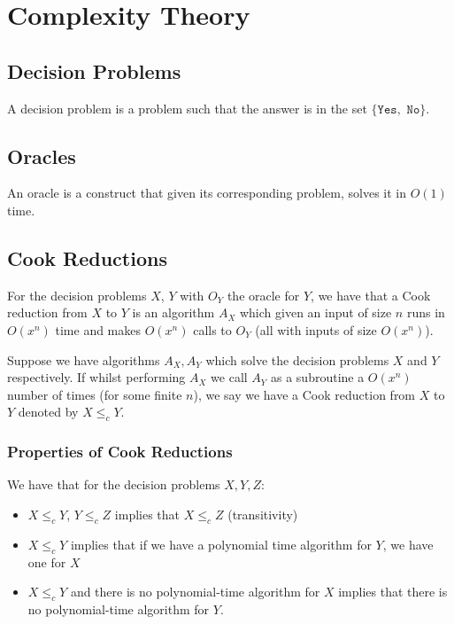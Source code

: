 \section{Complexity Theory}

\subsection{Decision Problems}

A decision problem is a problem such that the answer is in the set $\{\texttt{Yes},
\texttt{ No}\}$.

\subsection{Oracles}

An oracle is a construct that given its corresponding problem, solves it in
$O(1)$ time.

\subsection{Cook Reductions}

For the decision problems $X$, $Y$ with $O_Y$ the oracle for $Y$,
we have that a Cook reduction from $X$ to $Y$ is an algorithm $A_X$
which given an input of size $n$ runs in $O(x^n)$ time and makes
$O(x^n)$ calls to $O_Y$ (all with inputs of size $O(x^n)$).

Suppose we have algorithms $A_X, A_Y$ which solve the decision problems 
$X$ and $Y$ respectively. If whilst performing $A_X$ we call $A_Y$ as a 
subroutine a $O(x^n)$ number of times (for some finite $n$), we say
we have a Cook reduction from $X$ to $Y$ denoted by $X \leq_c Y$.

\subsubsection{Properties of Cook Reductions}

We have that for the decision problems $X, Y, Z$: \begin{itemize}
  \item $X \leq_c Y$, $Y \leq_c Z$ implies that $X \leq_c Z$ (transitivity)
  \item $X \leq_c Y$ implies that if we have a polynomial time algorithm for $Y$, 
  we have one for $X$
  \item $X \leq_c Y$ and there is no polynomial-time algorithm for $X$ implies 
  that there is no polynomial-time algorithm for $Y$.
\end{itemize}


